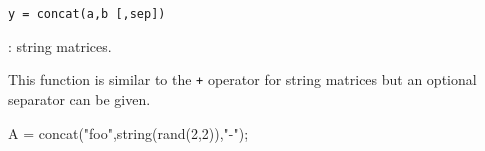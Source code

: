 
\begin{mandesc}
\end{mandesc}

\begin{calling_sequence}
\begin{verbatim}
y = concat(a,b [,sep])
\end{verbatim}
\end{calling_sequence}
\begin{parameters}
  \begin{varlist}
     : string matrices.
  \end{varlist}
\end{parameters}

\begin{mandescription}
  This function is similar to the \verb-+- operator for string 
  matrices but an optional separator can be given.
\end{mandescription}
\begin{examples}
  \begin{program}
    A = concat("foo",string(rand(2,2)),"-");
  \end{program}
\end{examples}

